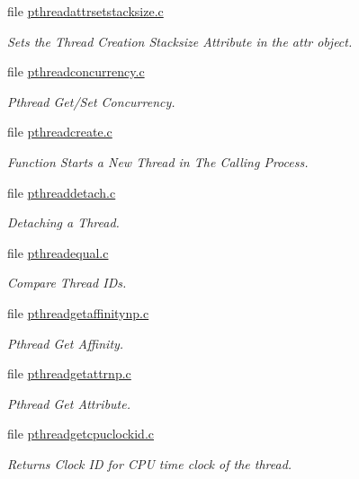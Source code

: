 \begin{DoxyCompactItemize}
file \mbox{\hyperlink{pthreadattrsetstacksize_8c}{pthreadattrsetstacksize.\+c}}
\begin{DoxyCompactList}\small\item\em Sets the Thread Creation Stacksize Attribute in the attr object. \end{DoxyCompactList}\item 
file \mbox{\hyperlink{pthreadconcurrency_8c}{pthreadconcurrency.\+c}}
\begin{DoxyCompactList}\small\item\em Pthread Get/\+Set Concurrency. \end{DoxyCompactList}\item 
file \mbox{\hyperlink{pthreadcreate_8c}{pthreadcreate.\+c}}
\begin{DoxyCompactList}\small\item\em Function Starts a New Thread in The Calling Process. \end{DoxyCompactList}\item 
file \mbox{\hyperlink{pthreaddetach_8c}{pthreaddetach.\+c}}
\begin{DoxyCompactList}\small\item\em Detaching a Thread. \end{DoxyCompactList}\item 
file \mbox{\hyperlink{pthreadequal_8c}{pthreadequal.\+c}}
\begin{DoxyCompactList}\small\item\em Compare Thread I\+Ds. \end{DoxyCompactList}\item 
file \mbox{\hyperlink{pthreadgetaffinitynp_8c}{pthreadgetaffinitynp.\+c}}
\begin{DoxyCompactList}\small\item\em Pthread Get Affinity. \end{DoxyCompactList}\item 
file \mbox{\hyperlink{pthreadgetattrnp_8c}{pthreadgetattrnp.\+c}}
\begin{DoxyCompactList}\small\item\em Pthread Get Attribute. \end{DoxyCompactList}\item 
file \mbox{\hyperlink{pthreadgetcpuclockid_8c}{pthreadgetcpuclockid.\+c}}
\begin{DoxyCompactList}\small\item\em Returns Clock ID for C\+PU time clock of the thread. \end{DoxyCompactList}\item 

\end{DoxyCompactItemize}
